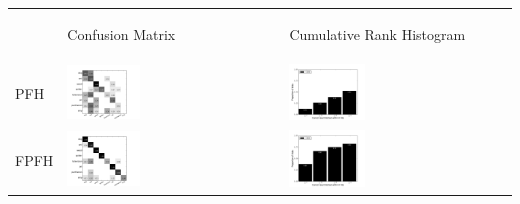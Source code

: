 
\begin{table}
\centering
\begin{tabular}{m{} m{} m{}}
  & \begin{center} Confusion Matrix \end{center} & \begin{center} Cumulative Rank Histogram \end{center} \\
  PFH & \includegraphics[width=0.35\textwidth,clip=true]{../figures/WGDB/PFH_confmat.png} & \includegraphics[width=0.35\textwidth,clip=true]{../figures/WGDB/PFH_rankhist.png} \\
  FPFH & \includegraphics[width=0.35\textwidth,clip=true]{../figures/WGDB/FPFH_confmat.png} & \includegraphics[width=0.35\textwidth,clip=true]{../figures/WGDB/FPFH_rankhist.png} \\

\end{tabular}
\end{table}
